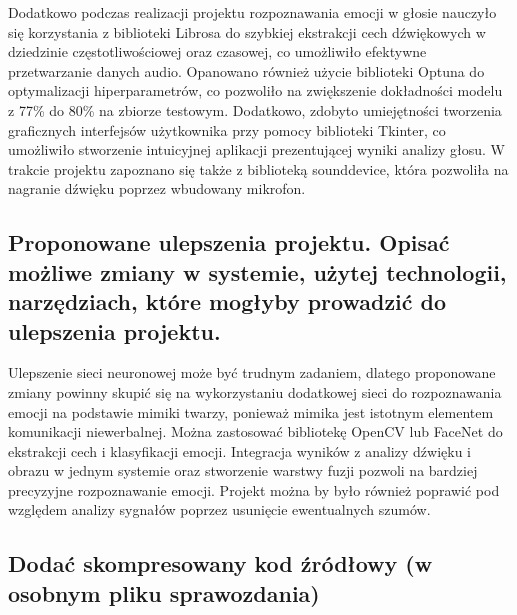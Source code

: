 \documentclass[12pt,titlepage]{article}
\begin{document}
Dodatkowo podczas realizacji projektu rozpoznawania emocji w głosie nauczyło się korzystania z biblioteki Librosa do szybkiej ekstrakcji cech dźwiękowych w dziedzinie częstotliwościowej oraz czasowej, co umożliwiło efektywne przetwarzanie danych audio. Opanowano również użycie biblioteki Optuna do optymalizacji hiperparametrów, co pozwoliło na zwiększenie dokładności modelu z 77\% do 80\% na zbiorze testowym. Dodatkowo, zdobyto umiejętności tworzenia graficznych interfejsów użytkownika przy pomocy biblioteki Tkinter, co umożliwiło stworzenie intuicyjnej aplikacji prezentującej wyniki analizy głosu.
W trakcie projektu zapoznano się także z biblioteką sounddevice, która pozwoliła na nagranie dźwięku poprzez wbudowany mikrofon.

\subsection{Proponowane ulepszenia projektu. Opisać możliwe zmiany w systemie, użytej technologii, narzędziach, które mogłyby prowadzić do ulepszenia projektu.}
Ulepszenie sieci neuronowej może być trudnym zadaniem, dlatego proponowane zmiany powinny skupić się na wykorzystaniu dodatkowej sieci do rozpoznawania emocji na podstawie mimiki twarzy, ponieważ mimika jest istotnym elementem komunikacji niewerbalnej. Można zastosować bibliotekę OpenCV lub FaceNet do ekstrakcji cech i klasyfikacji emocji. Integracja wyników z analizy dźwięku i obrazu w jednym systemie oraz stworzenie warstwy fuzji pozwoli na bardziej precyzyjne rozpoznawanie emocji.
Projekt można by było również poprawić pod względem analizy sygnałów poprzez usunięcie ewentualnych szumów. 
\subsection{Dodać skompresowany kod źródłowy (w osobnym pliku sprawozdania)}
\end{document}
